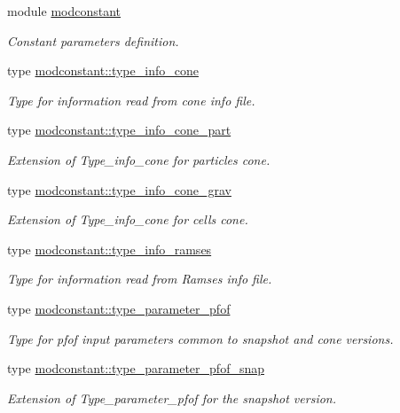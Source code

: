 \begin{DoxyCompactItemize}
\item 
module \hyperlink{classmodconstant}{modconstant}
\begin{DoxyCompactList}\small\item\em Constant parameters definition. \end{DoxyCompactList}\item 
type \hyperlink{structmodconstant_1_1type__info__cone}{modconstant\-::type\-\_\-info\-\_\-cone}
\begin{DoxyCompactList}\small\item\em Type for information read from cone info file. \end{DoxyCompactList}\item 
type \hyperlink{structmodconstant_1_1type__info__cone__part}{modconstant\-::type\-\_\-info\-\_\-cone\-\_\-part}
\begin{DoxyCompactList}\small\item\em Extension of Type\-\_\-info\-\_\-cone for particles cone. \end{DoxyCompactList}\item 
type \hyperlink{structmodconstant_1_1type__info__cone__grav}{modconstant\-::type\-\_\-info\-\_\-cone\-\_\-grav}
\begin{DoxyCompactList}\small\item\em Extension of Type\-\_\-info\-\_\-cone for cells cone. \end{DoxyCompactList}\item 
type \hyperlink{structmodconstant_1_1type__info__ramses}{modconstant\-::type\-\_\-info\-\_\-ramses}
\begin{DoxyCompactList}\small\item\em Type for information read from Ramses info file. \end{DoxyCompactList}\item 
type \hyperlink{structmodconstant_1_1type__parameter__pfof}{modconstant\-::type\-\_\-parameter\-\_\-pfof}
\begin{DoxyCompactList}\small\item\em Type for pfof input parameters common to snapshot and cone versions. \end{DoxyCompactList}\item 
type \hyperlink{structmodconstant_1_1type__parameter__pfof__snap}{modconstant\-::type\-\_\-parameter\-\_\-pfof\-\_\-snap}
\begin{DoxyCompactList}\small\item\em Extension of Type\-\_\-parameter\-\_\-pfof for the snapshot version. \end{DoxyCompactList}\item 

\end{DoxyCompactItemize}
